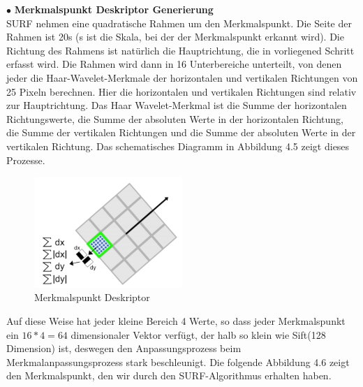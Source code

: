 $\bullet$ \textbf{Merkmalspunkt Deskriptor Generierung}\\
SURF nehmen eine quadratische Rahmen um den Merkmalspunkt. Die Seite der Rahmen ist 20s (s ist die Skala, bei der der Merkmalspunkt erkannt wird). Die Richtung des Rahmens ist natürlich die Hauptrichtung, die in vorliegened Schritt erfasst wird. Die Rahmen wird dann in 16 Unterbereiche unterteilt, von denen jeder die Haar-Wavelet-Merkmale der horizontalen und vertikalen Richtungen von 25 Pixeln berechnen. Hier die horizontalen und vertikalen Richtungen sind relativ zur Hauptrichtung. Das Haar Wavelet-Merkmal ist die Summe der horizontalen Richtungswerte, die Summe der absoluten Werte in der horizontalen Richtung, die Summe der vertikalen Richtungen und die Summe der absoluten Werte in der vertikalen Richtung. Das schematisches Diagramm in Abbildung 4.5 zeigt dieses Prozesse.

\begin{figure}[htb]
 \centering 
 \includegraphics[keepaspectratio,width=0.5\textwidth]{images/4_ZweiteErfahrung/Merkmalspunkt_Deskriptor.pdf}
 \caption{Merkmalspunkt Deskriptor}
 \label{fig:Merkmalspunkt Deskriptor}
\end{figure} 

Auf diese Weise hat jeder kleine Bereich 4 Werte, so dass jeder Merkmalspunkt ein $16*4=64$ dimensionaler Vektor verfügt, der halb so klein wie Sift(128 Dimension) ist, deswegen den Anpassungsprozess beim Merkmalanpassungsprozess stark beschleunigt. Die folgende Abbildung 4.6 zeigt den Merkmalspunkt, den wir durch den SURF-Algorithmus erhalten haben.

